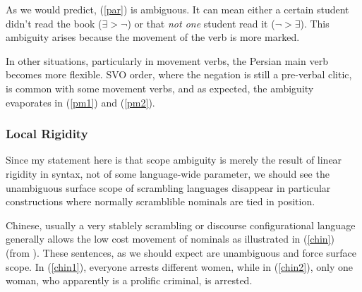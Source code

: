 \documentclass{article}
\begin{document}
As we would predict, (\ref{par}) is ambiguous. It can mean either a certain student didn't read the book ($\exists > \neg$) or that \emph{not one} student read it ($\neg > \exists$). This ambiguity arises because the movement of the verb is more marked.

In other situations, particularly in movement verbs, the Persian main verb becomes more flexible. SVO order, where the negation is still a pre-verbal clitic, is common with some movement verbs, and as expected, the ambiguity evaporates in (\ref{pm1}) and (\ref{pm2}).

\begin{exe}
\end{exe}


\subsubsection{Local Rigidity}

Since my statement here is that scope ambiguity is merely the result of linear rigidity in syntax, not of some language-wide parameter, we should see the unambiguous surface scope of scrambling languages disappear in particular constructions where normally scramblible nominals are tied in position.

Chinese, usually a very stablely scrambling or discourse configurational language generally allows the low cost movement of nominals as illustrated in (\ref{chin}) (from \textcite{aoun93}). These sentences, as we should expect are unambiguous and force surface scope. In (\ref{chin1}), everyone arrests different women, while in (\ref{chin2}), only one woman, who apparently is a prolific criminal, is arrested.

\begin{exe}
\ex \begin{xlist}\label{chin}
\end{xlist}
\end{exe}
\end{document}
